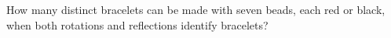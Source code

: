 How many distinct bracelets can be made with seven beads, each red or black, when both rotations and reflections identify bracelets?
